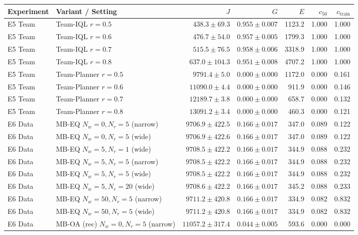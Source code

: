 \begin{tabular}{llrrrrr}
\toprule
Experiment & Variant / Setting & $J$ & $G$ & $E$ & $c_{50}$ & $c_{\text{train}}$ \\
\midrule
E5 Team & Team-IQL $r=0.5$ & $438.3 \pm 69.3$ & $0.955 \pm 0.007$ & 1123.2 & 1.000 & 1.000 \\
E5 Team & Team-IQL $r=0.6$ & $476.7 \pm 54.0$ & $0.957 \pm 0.005$ & 1799.3 & 1.000 & 1.000 \\
E5 Team & Team-IQL $r=0.7$ & $515.5 \pm 76.5$ & $0.958 \pm 0.006$ & 3318.9 & 1.000 & 1.000 \\
E5 Team & Team-IQL $r=0.8$ & $637.0 \pm 104.3$ & $0.951 \pm 0.008$ & 4707.2 & 1.000 & 1.000 \\
E5 Team & Team-Planner $r=0.5$ & $9791.4 \pm 5.0$ & $0.000 \pm 0.000$ & 1172.0 & 0.000 & 0.161 \\
E5 Team & Team-Planner $r=0.6$ & $11090.0 \pm 4.4$ & $0.000 \pm 0.000$ & 911.9 & 0.000 & 0.146 \\
E5 Team & Team-Planner $r=0.7$ & $12189.7 \pm 3.8$ & $0.000 \pm 0.000$ & 658.7 & 0.000 & 0.132 \\
E5 Team & Team-Planner $r=0.8$ & $13091.2 \pm 3.4$ & $0.000 \pm 0.000$ & 460.3 & 0.000 & 0.121 \\
\midrule
E6 Data & MB-EQ $N_w=0, N_r=5$ (narrow) & $9706.9 \pm 422.5$ & $0.166 \pm 0.017$ & 347.0 & 0.089 & 0.122 \\
E6 Data & MB-EQ $N_w=0, N_r=5$ (wide) & $9706.9 \pm 422.6$ & $0.166 \pm 0.017$ & 347.0 & 0.089 & 0.122 \\
E6 Data & MB-EQ $N_w=5, N_r=1$ (wide) & $9708.5 \pm 422.2$ & $0.166 \pm 0.017$ & 344.9 & 0.088 & 0.232 \\
E6 Data & MB-EQ $N_w=5, N_r=5$ (narrow) & $9708.5 \pm 422.2$ & $0.166 \pm 0.017$ & 344.9 & 0.088 & 0.232 \\
E6 Data & MB-EQ $N_w=5, N_r=5$ (wide) & $9708.5 \pm 422.2$ & $0.166 \pm 0.017$ & 344.9 & 0.088 & 0.232 \\
E6 Data & MB-EQ $N_w=5, N_r=20$ (wide) & $9708.6 \pm 422.2$ & $0.166 \pm 0.017$ & 345.2 & 0.088 & 0.233 \\
E6 Data & MB-EQ $N_w=50, N_r=5$ (narrow) & $9711.2 \pm 420.8$ & $0.166 \pm 0.017$ & 334.9 & 0.082 & 0.832 \\
E6 Data & MB-EQ $N_w=50, N_r=5$ (wide) & $9711.2 \pm 420.8$ & $0.166 \pm 0.017$ & 334.9 & 0.082 & 0.832 \\
E6 Data & MB-OA (rec) $N_w=0, N_r=5$ (narrow) & $11057.2 \pm 317.4$ & $0.044 \pm 0.005$ & 593.6 & 0.000 & 0.000 \\

\end{tabular}
